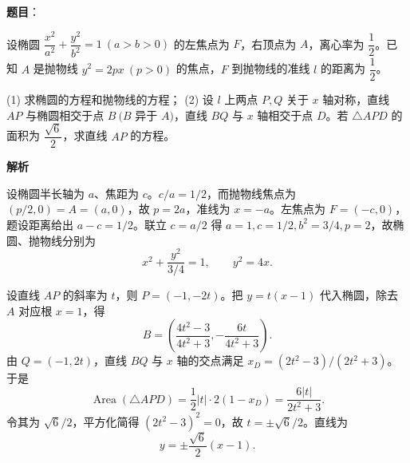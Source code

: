 \begin{answer}

\textbf{题目}：

设椭圆 $\dfrac{x^2}{a^2}+\dfrac{y^2}{b^2}=1\ (a>b>0)$ 的左焦点为 $F$，右顶点为 $A$，离心率为 $\dfrac12$。已知 $A$ 是抛物线 $y^2=2px\ (p>0)$ 的焦点，$F$ 到抛物线的准线 $l$ 的距离为 $\dfrac12$。

(1)   求椭圆的方程和抛物线的方程；
(2)   设 $l$ 上两点 $P,Q$ 关于 $x$ 轴对称，直线 $AP$ 与椭圆相交于点 $B\ (B$ 异于 $A)$，直线 $BQ$ 与 $x$ 轴相交于点 $D$。若 $\triangle APD$ 的面积为 $\dfrac{\sqrt6}{2}$，求直线 $AP$ 的方程。

\textbf{解析}


设椭圆半长轴为 $a$、焦距为 $c$。$c/a=1/2$，而抛物线焦点为 $(p/2,0)=A=(a,0)$，故 $p=2a$，准线为 $x=-a$。左焦点为 $F=(-c,0)$，题设距离给出 $a-c=1/2$。联立 $c=a/2$ 得 $a=1,c=1/2,b^2=3/4,p=2$，故椭圆、抛物线分别为
\nopagebreak[4]
\[
x^2+\frac{y^2}{3/4}=1,\qquad y^2=4x.
\]


设直线 $AP$ 的斜率为 $t$，则 $P=(-1,-2t)$。把 $y=t(x-1)$ 代入椭圆，除去 $A$ 对应根 $x=1$，得
\nopagebreak[4]
\[
B=\left(\frac{4t^2-3}{4t^2+3},-\frac{6t}{4t^2+3}\right).
\]
由 $Q=(-1,2t)$，直线 $BQ$ 与 $x$ 轴的交点满足 $x_D=(2t^2-3)/(2t^2+3)$。于是
\nopagebreak[4]
\[
\operatorname{Area}(\triangle APD)=\frac12|t|\cdot2(1-x_D)=\frac{6|t|}{2t^2+3}.
\]
令其为 $\sqrt6/2$，平方化简得 $(2t^2-3)^2=0$，故 $t=\pm\sqrt6/2$。直线为
\nopagebreak[4]
\[
y=\pm\frac{\sqrt6}{2}(x-1).
\]



\end{answer}

